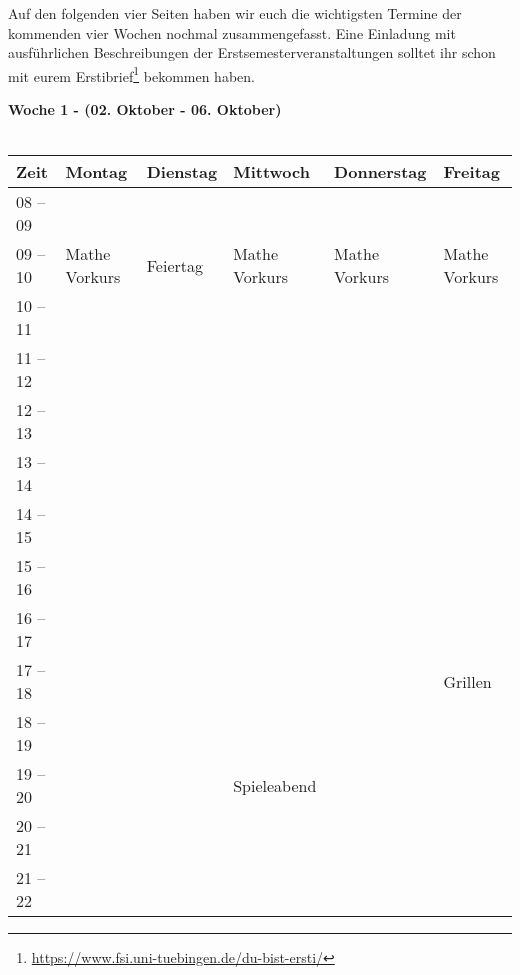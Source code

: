 Auf den folgenden vier Seiten haben wir euch die wichtigsten Termine der kommenden vier Wochen nochmal zusammengefasst. Eine Einladung mit ausführlichen Beschreibungen der Erstsemesterveranstaltungen solltet ihr schon mit eurem Erstibrief\footnote{\url{https://www.fsi.uni-tuebingen.de/du-bist-ersti/}} bekommen haben.
\vfill




\textbf{Woche 1 - (02. Oktober - 06. Oktober)}\\
\\
\begin{tabular}{|l|p{}|p{}|p{}|p{}|p{}|} \hline
 Zeit & Montag & Dienstag & Mittwoch & Donnerstag & Freitag \\ 
 \hline \hline
 08 -- 09 & & & & & \\ \cline{1-1} 
\cline{2-6}
 09 -- 10 &\footnotesize{Mathe Vorkurs} & \footnotesize{Feiertag} &\footnotesize{Mathe Vorkurs} & \footnotesize{Mathe Vorkurs} & \footnotesize{Mathe Vorkurs} \\ \cline{1-1}
 10 -- 11 & & & & & \\ \cline{1-1}
 11 -- 12 & & & & & \\ \cline{1-1}
 12 -- 13 & & & & & \\ \cline{1-1} 
 13 -- 14 & & & & & \\ \cline{1-1}
 14 -- 15 & & & & & \\ \cline{1-1}
 15 -- 16 & & & & & \\ \cline{1-2}\cline{4-6}
 16 -- 17 & & & & & \\ \cline{1-1}
 17 -- 18 & & & & &  \cellcolor{lightlightgray} \footnotesize{Grillen}\\ \cline{1-1} \cline{6-6}	
 18 -- 19 & & & & & \cellcolor{lightlightgray} \\ \cline{1-1}
 19 -- 20 & & &\cellcolor{lightlightgray} \footnotesize{Spieleabend} & & \cellcolor{lightlightgray}   \\ \cline{1-1}
 20 -- 21 & & &\cellcolor{lightlightgray} & &\cellcolor{lightlightgray}  \\ \cline{1-1}
 21 -- 22 & & &\cellcolor{lightlightgray} & & \cellcolor{lightlightgray}\\ \hline
 \end{tabular}
\vfil

